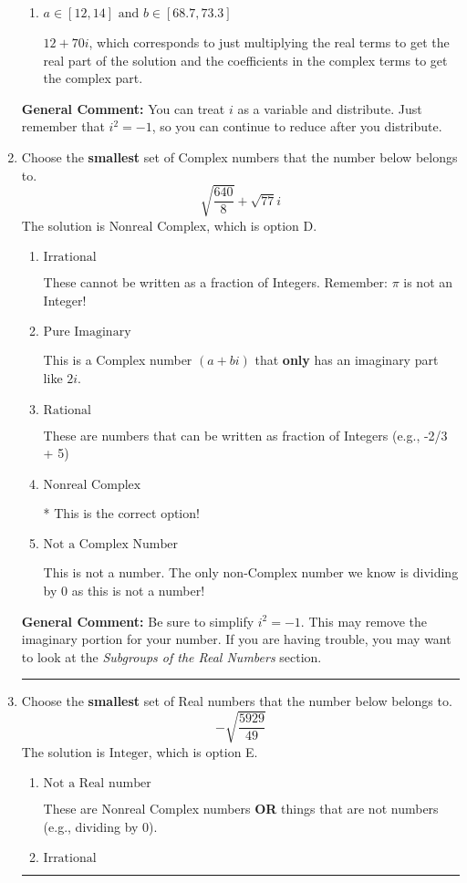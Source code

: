 \documentclass{extbook}[14pt]
\newcommand{\litem}[1]{\item #1

\rule{\textwidth}{0.4pt}}
\begin{document}
\begin{enumerate}
{\begin{enumerate}[label=\Alph*.]
 $82 - 46 i$, which corresponds to adding a minus sign in the first term.
\item \( a \in [12, 14] \text{ and } b \in [68.7, 73.3] \)

 $12 + 70 i$, which corresponds to just multiplying the real terms to get the real part of the solution and the coefficients in the complex terms to get the complex part.
\end{enumerate}

\textbf{General Comment:} You can treat $i$ as a variable and distribute. Just remember that $i^2=-1$, so you can continue to reduce after you distribute.
}
\litem{
Choose the \textbf{smallest} set of Complex numbers that the number below belongs to.
\[ \sqrt{\frac{640}{8}}+\sqrt{77} i \]
The solution is \( \text{Nonreal Complex} \), which is option D.\begin{enumerate}[label=\Alph*.]
\item \( \text{Irrational} \)

These cannot be written as a fraction of Integers. Remember: $\pi$ is not an Integer!
\item \( \text{Pure Imaginary} \)

This is a Complex number $(a+bi)$ that \textbf{only} has an imaginary part like $2i$.
\item \( \text{Rational} \)

These are numbers that can be written as fraction of Integers (e.g., -2/3 + 5)
\item \( \text{Nonreal Complex} \)

* This is the correct option!
\item \( \text{Not a Complex Number} \)

This is not a number. The only non-Complex number we know is dividing by 0 as this is not a number!
\end{enumerate}

\textbf{General Comment:} Be sure to simplify $i^2 = -1$. This may remove the imaginary portion for your number. If you are having trouble, you may want to look at the \textit{Subgroups of the Real Numbers} section.
}
\litem{
Choose the \textbf{smallest} set of Real numbers that the number below belongs to.
\[ -\sqrt{\frac{5929}{49}} \]
The solution is \( \text{Integer} \), which is option E.\begin{enumerate}[label=\Alph*.]
\item \( \text{Not a Real number} \)

These are Nonreal Complex numbers \textbf{OR} things that are not numbers (e.g., dividing by 0).
\item \( \text{Irrational} \)


\end{enumerate}}
\end{enumerate}
\end{document}
